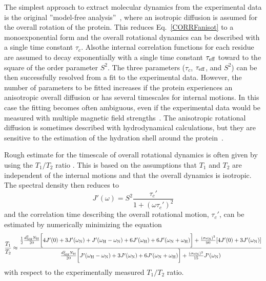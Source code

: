 \documentclass[journal=jpcbfk,manuscript=article]{achemso}
\providecommand{\DIFadd}[1]{{\protect\color{blue}\uwave{#1}}} %
\providecommand{\DIFaddbegin}{} %
\providecommand{\DIFaddend}{} %
\begin{document}
The simplest approach to extract molecular dynamics from the experimental
data is the original ''model-free analysis''~\cite{Lipari82},
where an isotropic diffusion is assumed for the overall rotation of the protein.
This reduces Eq.~\ref{CORRFanisot} to a monoexponential form and the overall rotational
dynamics can be described with a single time constant $\tau_c$.
Also\DIFaddbegin \DIFadd{, }\DIFaddend the internal correlation functions for each residue are assumed
to decay exponentially with a single time constant $\tau_{\rm eff}$
toward to the square of the order parameter $S^2$. The three parameters
($\tau_c$, $\tau_{\rm eff}$, and $S^2$) can be then successfully resolved from a
fit to the experimental data.
However, the number of parameters to be fitted increases if the protein
experiences an anisotropic overall diffusion or has several timescales for internal motions.
In this case the fitting becomes often ambiguous, even if the experimental data
would be measured with multiple magnetic field strengths~\cite{dosset00,luginbuhl97,jarymowycz06}.
The anisotropic rotational diffusion is sometimes described with hydrodynamical
calculations, but they are sensitive to the estimation of the
hydration shell around the protein~\cite{torre00}.

Rough estimate for the timescale of overall rotational dynamics 
is often given by using the $T_1/T_2$ ratio \cite{kay89}. 
This is based on the assumptions that $T_1$ and $T_2$
are independent of the internal motions and that the overall
dynamics is isotropic. The spectral density then reduces to 
\begin{equation}
J'(\omega) = S^2\frac{\tau_c'}{1+(\omega \tau_c')^2} 
\end{equation}
and the correlation time describing the overall rotational motion, $\tau_c'$, can 
be estimated by numerically minimizing the equation
\begin{equation}\label{ratioEQ}
  \frac{T_1}{T_2} \approx  \frac{\frac{1}{2}\frac{d_{\rm{NH}}^2N_{\rm{H}}}{20}\bigg[4J'(0)+3J'(\omega_{\rm{N}})+J'(\omega_{\rm{H}}-\omega_{\rm{N}})+6J'(\omega_{\rm{H}})  +6J'(\omega_{\rm{N}}+\omega_{\rm{H}})\bigg]+\frac{(\sigma \omega_{\rm{N}})^2}{90}[4J'(0) +3J'(\omega_{\rm{N}})]}{\frac{d_{\rm{NH}}^2N_{\rm{H}}}{20}\bigg[J'(\omega_{\rm{H}}-\omega_{\rm{N}})+3J'(\omega_{\rm{N}})+6J'(\omega_{\rm{N}}+\omega_{\rm{H}})\bigg] +\frac{(\sigma \omega_{\rm{N}})^2}{15}J'(\omega_{\rm{N}})}
\end{equation}
with respect to the experimentally measured $T_1/T_2$ ratio.
\end{document}
